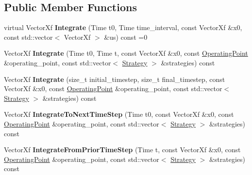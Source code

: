 \subsection*{Public Member Functions}
\begin{DoxyCompactItemize}
\item 
virtual Vector\+Xf {\bfseries Integrate} (Time t0, Time time\+\_\+interval, const Vector\+Xf \&x0, const std\+::vector$<$ Vector\+Xf $>$ \&us) const =0\hypertarget{classilqgames_1_1_multi_player_integrable_system_a591b1d66f51b95cf6e5bd1bd3b1c6f4d}{}\label{classilqgames_1_1_multi_player_integrable_system_a591b1d66f51b95cf6e5bd1bd3b1c6f4d}

\item 
Vector\+Xf {\bfseries Integrate} (Time t0, Time t, const Vector\+Xf \&x0, const \hyperlink{structilqgames_1_1_operating_point}{Operating\+Point} \&operating\+\_\+point, const std\+::vector$<$ \hyperlink{structilqgames_1_1_strategy}{Strategy} $>$ \&strategies) const \hypertarget{classilqgames_1_1_multi_player_integrable_system_a92e9cc0b05d1402a5ccc2a45f2c16f63}{}\label{classilqgames_1_1_multi_player_integrable_system_a92e9cc0b05d1402a5ccc2a45f2c16f63}

\item 
Vector\+Xf {\bfseries Integrate} (size\+\_\+t initial\+\_\+timestep, size\+\_\+t final\+\_\+timestep, const Vector\+Xf \&x0, const \hyperlink{structilqgames_1_1_operating_point}{Operating\+Point} \&operating\+\_\+point, const std\+::vector$<$ \hyperlink{structilqgames_1_1_strategy}{Strategy} $>$ \&strategies) const \hypertarget{classilqgames_1_1_multi_player_integrable_system_a38241e3d9edb8ec9ff3c7755b755d689}{}\label{classilqgames_1_1_multi_player_integrable_system_a38241e3d9edb8ec9ff3c7755b755d689}

\item 
Vector\+Xf {\bfseries Integrate\+To\+Next\+Time\+Step} (Time t0, const Vector\+Xf \&x0, const \hyperlink{structilqgames_1_1_operating_point}{Operating\+Point} \&operating\+\_\+point, const std\+::vector$<$ \hyperlink{structilqgames_1_1_strategy}{Strategy} $>$ \&strategies) const \hypertarget{classilqgames_1_1_multi_player_integrable_system_abba5990a5ccb56588e252a05f0b84b0f}{}\label{classilqgames_1_1_multi_player_integrable_system_abba5990a5ccb56588e252a05f0b84b0f}

\item 
Vector\+Xf {\bfseries Integrate\+From\+Prior\+Time\+Step} (Time t, const Vector\+Xf \&x0, const \hyperlink{structilqgames_1_1_operating_point}{Operating\+Point} \&operating\+\_\+point, const std\+::vector$<$ \hyperlink{structilqgames_1_1_strategy}{Strategy} $>$ \&strategies) const \hypertarget{classilqgames_1_1_multi_player_integrable_system_ada6af6c39bac2fda2043302b0e6c965c}{}\label{classilqgames_1_1_multi_player_integrable_system_ada6af6c39bac2fda2043302b0e6c965c}


\end{DoxyCompactItemize}
